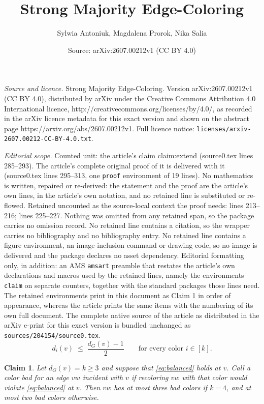 \documentclass[10pt,a4paper]{amsart}
\title{Strong Majority Edge-Coloring}
\author{Sylwia Antoniuk, Magdalena Prorok, Nika Salia}
\date{Source: arXiv:2607.00212v1 (CC BY 4.0)}
\newtheorem{claim}{Claim}
\begin{document}
\maketitle

\noindent\emph{Source and licence.} Strong Majority Edge-Coloring. Version arXiv:2607.00212v1 (CC BY 4.0), distributed by arXiv under the Creative Commons Attribution 4.0 International licence, http://creativecommons.org/licenses/by/4.0/, as recorded in the arXiv licence metadata for this exact version and shown on the abstract page https://arxiv.org/abs/2607.00212v1. Full licence notice: \texttt{licenses/arxiv-2607.00212-CC-BY-4.0.txt}.\par\smallskip

\noindent\textit{Editorial scope.} Counted unit: the article's claim claim:extend (source0.tex lines 285--293). The article's complete original proof of it is delivered with it (source0.tex lines 295--313, one \texttt{proof} environment of 19 lines). No mathematics is written, repaired or re-derived: the statement and the proof are the article's own lines, in the article's own notation, and no retained line is substituted or re-flowed.  Retained uncounted as the source-local context the proof needs: lines 213--216; lines 225--227.  Nothing was omitted from any retained span, so the package carries no omission record.  No retained line contains a citation, so the wrapper carries no bibliography and no bibliography entry.  No retained line contains a figure environment, an image-inclusion command or drawing code, so no image is delivered and the package declares no asset dependency.  Editorial formatting only, in addition: an AMS \texttt{amsart} preamble that restates the article's own declarations and macros used by the retained lines, namely the environments \texttt{claim} on separate counters, together with the standard packages those lines need.  The retained environments print in this document as Claim 1 in order of appearance, whereas the article prints the same items with the numbering of its own full document.  The complete native source of the article as distributed in the arXiv e-print for this exact version is bundled unchanged as \texttt{sources/204154/source0.tex}.
\begin{equation}\label{eq:balanced}
        d_i(v)\;\le\;\frac{d_G(v)-1}{2}
        \qquad\text{for every color }i \in [k].
\end{equation}

\begin{claim}\label{claim:bad}
Let $d_G(v)=k\ge 3$ and suppose that \eqref{eq:balanced} holds at $v$. Call a color \emph{bad} for an edge $vw$ incident with $v$ if recoloring $vw$ with that color would violate \eqref{eq:balanced} at $v$. Then $vw$ has at most three bad colors if $k=4$, and at most two bad colors otherwise.
\end{claim}
\end{document}
